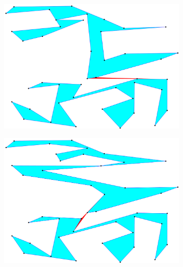\documentclass[conference]{IEEEtran}
\begin{document}
\begin{figure}[htbp]
			\begin{subfigure}{0.45\linewidth}
				\centering
				\includegraphics[width=0.99\textwidth]{fig1e.png}
				\caption{}
				\label{fig1e}
			\end{subfigure}
			\begin{subfigure}{0.45\linewidth}
				\centering
				\includegraphics[width=0.99\textwidth]{fig1f.png}
				\caption{}
				\label{fig1f}
			\end{subfigure}
			

\end{figure}
\end{document}
